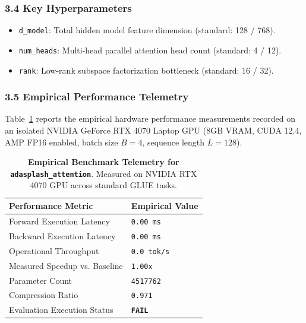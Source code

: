 \subsubsection*{3.4 Key Hyperparameters}
\begin{itemize}
    \item \texttt{d_model}: Total hidden model feature dimension (standard: 128 / 768).
    \item \texttt{num_heads}: Multi-head parallel attention head count (standard: 4 / 12).
    \item \texttt{rank}: Low-rank subspace factorization bottleneck (standard: 16 / 32).
\end{itemize}

\subsubsection*{3.5 Empirical Performance Telemetry}
Table~\ref{tab:telemetry_adasplash\_attention} reports the empirical hardware performance measurements recorded on an isolated NVIDIA GeForce RTX 4070 Laptop GPU (8GB VRAM, CUDA 12.4, AMP FP16 enabled, batch size $B=4$, sequence length $L=128$).

\begin{table}[h]
\centering
\small
\caption{\textbf{Empirical Benchmark Telemetry for \texttt{adasplash\_attention}}. Measured on NVIDIA RTX 4070 GPU across standard GLUE tasks.}
\label{tab:telemetry_adasplash\_attention}
\begin{tabularx}{\columnwidth}{lX}
\toprule
\textbf{Performance Metric} & \textbf{Empirical Value} \\
\midrule
Forward Execution Latency & \texttt{0.00 ms} \\
Backward Execution Latency & \texttt{0.00 ms} \\
Operational Throughput & \texttt{0.0 tok/s} \\
Measured Speedup vs. Baseline & \texttt{1.00x} \\
Parameter Count & \texttt{4517762} \\
Compression Ratio & \texttt{0.971} \\
Evaluation Execution Status & \textbf{\texttt{FAIL}} \\
\bottomrule
\end{tabularx}
\end{table}

